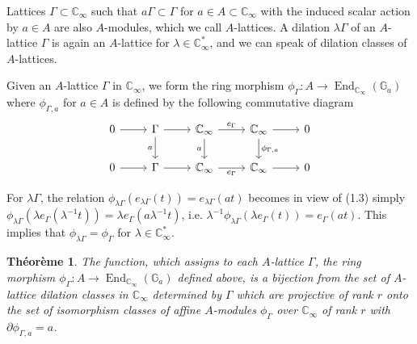 \documentclass[12pt,a4paper]{article}
\theoremstyle{plain}
\newtheorem{theorem}{Th\'eor\`eme}[section]
\theoremstyle{definition}
\theoremstyle{remark}
\DeclareMathOperator{\End}{End}
\begin{document}
Lattices $\Gamma \subset \mathbb{C}_\infty$ such that $a\Gamma \subset \Gamma$ for 
$a \in A \subset \mathbb{C}_\infty$ with the induced scalar action by $a \in A$ 
are also $A$-modules, which we call $A$-lattices. A dilation $\lambda\Gamma$ of 
an $A$-lattice $\Gamma$ is again an $A$-lattice for $\lambda \in \mathbb{C}_\infty^*$, 
and we can speak of dilation classes of $A$-lattices.

Given an $A$-lattice $\Gamma$ in $\mathbb{C}_\infty$, we form the ring morphism 
$\phi_\Gamma\colon A \to \End_{\mathbb{C}_\infty}(\mathbb{G}_a)$ where 
$\phi_{\Gamma,a}$ for $a \in A$ is defined by the following commutative diagram
\[
\begin{tikzcd}
0 \arrow[r] & \Gamma \arrow[r] \arrow[d, "a"'] & \mathbb{C}_\infty \arrow[r, "e_\Gamma"] \arrow[d, "a"'] & \mathbb{C}_\infty \arrow[r] \arrow[d, "\phi_{\Gamma,a}"] & 0 \\
0 \arrow[r] & \Gamma \arrow[r] & \mathbb{C}_\infty \arrow[r, "e_\Gamma"'] & \mathbb{C}_\infty \arrow[r] & 0
\end{tikzcd}
\]

For $\lambda\Gamma$, the relation 
$\phi_{\lambda\Gamma}(e_{\lambda\Gamma}(t)) = e_{\lambda\Gamma}(at)$ becomes in 
view of (1.3) simply $\phi_{\lambda\Gamma}(\lambda e_\Gamma(\lambda^{-1}t)) = \lambda 
e_\Gamma(a\lambda^{-1}t)$, i.e. $\lambda^{-1}\phi_{\lambda\Gamma}(\lambda e_\Gamma(t)) 
= e_\Gamma(at)$. This implies that $\phi_{\lambda\Gamma} = \phi_\Gamma$ for 
$\lambda \in \mathbb{C}_\infty^*$.

\begin{theorem}
The function, which assigns to each $A$-lattice $\Gamma$, the ring morphism 
$\phi_\Gamma\colon A \to \End_{\mathbb{C}_\infty}(\mathbb{G}_a)$ defined above, is 
a bijection from the set of $A$-lattice dilation classes in 
$\mathbb{C}_\infty$ determined by $\Gamma$ which are projective of rank $r$ 
onto the set of isomorphism classes of affine $A$-modules $\phi_\Gamma$ over 
$\mathbb{C}_\infty$ of rank $r$ with $\partial\phi_{\Gamma,a} = a$.
\end{theorem}
\end{document}
